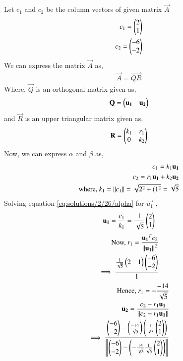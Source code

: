Let $c_1$ and $c_2$ be the column vectors of given matrix $\vec{A}$
\begin{align}
c_1 = \begin{pmatrix}2\\1\end{pmatrix}\\
c_2 = \begin{pmatrix}-6\\-2\end{pmatrix}
\end{align}
We can express the matrix $\vec{A}$ as,
\begin{align}
\vec{A}=\vec{QR}
\end{align}
Where, $\vec{Q}$ is an orthogonal matrix given as,
\begin{align}
\mathbf{Q} = \begin{pmatrix}\mathbf{u_1}&\mathbf{u_2}\end{pmatrix}\label{eq:solutions/2/26/orthogonal}
\end{align}
and $\vec{R}$ is an upper triangular matrix given as,
\begin{align}
\mathbf{R} = \begin{pmatrix}k_1&r_1\\0&k_2\end{pmatrix}
\label{eq:solutions/2/26/UT}
\end{align}
Now, we can express $\alpha$ and $\beta$ as,
\begin{align}
c_1 = k_1\mathbf{u_1}\label{eq:solutions/2/26/alpha}\\
c_2 = r_1\mathbf{u_1} +k_2\mathbf{u_2}\label{eq:solutions/2/26/beta}\\
\mbox{where, } k_1 = \left\lVert c_1\right\rVert = \sqrt{2^2+(1^2} = \sqrt{5}\label{eq:solutions/2/26/k1}
\end{align} 
Solving equation \eqref{eq:solutions/2/26/alpha} for $\vec{u_1}$ ,
\begin{align}
\mathbf{u_1} = \frac{c_1}{k_1} = \frac{1}{\sqrt{5}}\begin{pmatrix}2\\1\end{pmatrix}\label{eq:solutions/2/26/u1}
\end{align}
\begin{align}
\mbox{Now, } r_1 = \frac{\mathbf{u_1}^Tc_2}{\left\lVert\mathbf{u_1}\right\rVert^2}\\
\implies \frac{\frac{1}{\sqrt{5}}\begin{pmatrix}2&1\end{pmatrix}\begin{pmatrix}-6\\-2\end{pmatrix}}{1}
\end{align}
\begin{align}
\mbox{Hence, } r_1 = -\frac{-14}{\sqrt{5}}
\label{eq:solutions/2/26/r1}\\
\mathbf{u_2} = \frac{c_2-r_1\mathbf{u_1}}{\left\lVert c_2-r_1\mathbf{u_1}\right\rVert}\\
\implies \frac{\begin{pmatrix}-6\\-2\end{pmatrix} - \left(\frac{-14}{\sqrt{5}}\right)\left(\frac{1}{\sqrt{5}}\begin{pmatrix}2\\1\end{pmatrix}\right)}{\left\lVert\begin{pmatrix}-6\\-2\end{pmatrix} - \left(-\frac{14}{\sqrt{5}}\frac{1}{\sqrt{5}}\begin{pmatrix}2\\1\end{pmatrix}\right)\right\rVert} 
\end{align}
